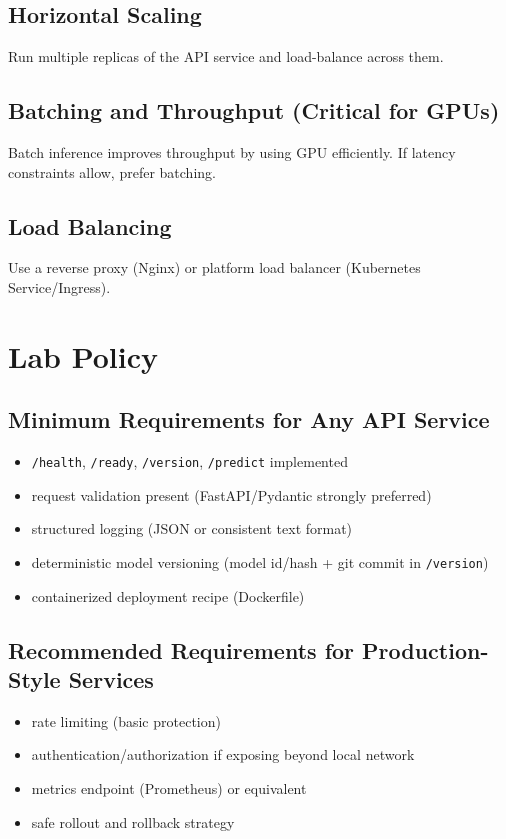 \documentclass[11pt]{article}
\begin{document}
\subsection{Horizontal Scaling}
Run multiple replicas of the API service and load-balance across them.

\subsection{Batching and Throughput (Critical for GPUs)}
Batch inference improves throughput by using GPU efficiently.
If latency constraints allow, prefer batching.

\subsection{Load Balancing}
Use a reverse proxy (Nginx) or platform load balancer (Kubernetes Service/Ingress).

\section{Lab Policy}

\subsection{Minimum Requirements for Any API Service}
\begin{itemize}
  \item \texttt{/health}, \texttt{/ready}, \texttt{/version}, \texttt{/predict} implemented
  \item request validation present (FastAPI/Pydantic strongly preferred)
  \item structured logging (JSON or consistent text format)
  \item deterministic model versioning (model id/hash + git commit in \texttt{/version})
  \item containerized deployment recipe (Dockerfile)
\end{itemize}

\subsection{Recommended Requirements for Production-Style Services}
\begin{itemize}
  \item rate limiting (basic protection)
  \item authentication/authorization if exposing beyond local network
  \item metrics endpoint (Prometheus) or equivalent
  \item safe rollout and rollback strategy
\end{itemize}
\end{document}
